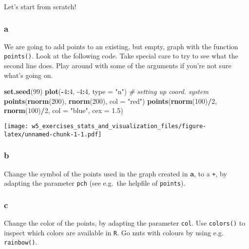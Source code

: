 \documentclass[]{article}
\newenvironment{Shaded}{\begin{snugshade}}{\end{snugshade}}
\newcommand{\CommentTok}[1]{\textcolor[rgb]{0.56,0.35,0.01}{\textit{#1}}}
\newcommand{\DataTypeTok}[1]{\textcolor[rgb]{0.13,0.29,0.53}{#1}}
\newcommand{\DecValTok}[1]{\textcolor[rgb]{0.00,0.00,0.81}{#1}}
\newcommand{\FloatTok}[1]{\textcolor[rgb]{0.00,0.00,0.81}{#1}}
\newcommand{\KeywordTok}[1]{\textcolor[rgb]{0.13,0.29,0.53}{\textbf{#1}}}
\newcommand{\NormalTok}[1]{#1}
\newcommand{\OperatorTok}[1]{\textcolor[rgb]{0.81,0.36,0.00}{\textbf{#1}}}
\newcommand{\StringTok}[1]{\textcolor[rgb]{0.31,0.60,0.02}{#1}}
\begin{document}
Let's start from scratch!

\hypertarget{a-2}{%
\subsubsection{a}\label{a-2}}

We are going to add points to an existing, but empty, graph with the
function \texttt{points()}. Look at the following code. Take special
care to try to see what the second line does. Play around with some of
the arguments if you're not sure what's going on.

\begin{Shaded}
\begin{Highlighting}[]
\KeywordTok{set.seed}\NormalTok{(}\DecValTok{99}\NormalTok{)}
\KeywordTok{plot}\NormalTok{(}\OperatorTok{-}\DecValTok{4}\OperatorTok{:}\DecValTok{4}\NormalTok{, }\DecValTok{-4}\OperatorTok{:}\DecValTok{4}\NormalTok{, }\DataTypeTok{type =} \StringTok{"n"}\NormalTok{)  }\CommentTok{# setting up coord. system}
\KeywordTok{points}\NormalTok{(}\KeywordTok{rnorm}\NormalTok{(}\DecValTok{200}\NormalTok{), }\KeywordTok{rnorm}\NormalTok{(}\DecValTok{200}\NormalTok{), }\DataTypeTok{col =} \StringTok{"red"}\NormalTok{)}
\KeywordTok{points}\NormalTok{(}\KeywordTok{rnorm}\NormalTok{(}\DecValTok{100}\NormalTok{)}\OperatorTok{/}\DecValTok{2}\NormalTok{, }\KeywordTok{rnorm}\NormalTok{(}\DecValTok{100}\NormalTok{)}\OperatorTok{/}\DecValTok{2}\NormalTok{, }\DataTypeTok{col =} \StringTok{"blue"}\NormalTok{, }\DataTypeTok{cex =} \FloatTok{1.5}\NormalTok{)}
\end{Highlighting}
\end{Shaded}

\texttt{[image: w5\_exercises\_stats\_and\_visualization\_files/figure-latex/unnamed-chunk-1-1.pdf]}

\hypertarget{b-2}{%
\subsubsection{b}\label{b-2}}

Change the symbol of the points used in the graph created in \textbf{a},
to a \texttt{+}, by adapting the parameter \texttt{pch} (see e.g.~the
helpfile of \texttt{points}).

\hypertarget{c-2}{%
\subsubsection{c}\label{c-2}}

Change the color of the points, by adapting the parameter \texttt{col}.
Use \texttt{colors()} to inspect which colors are available in
\texttt{R}. Go nuts with colours by using e.g. \texttt{rainbow()}.
\end{document}
